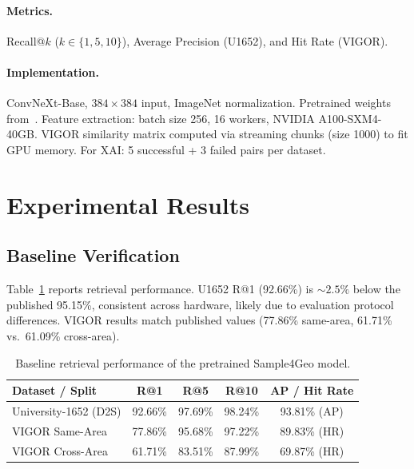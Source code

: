 \documentclass{article}
\begin{document}
\paragraph{Metrics.} Recall@$k$ ($k{\in}\{1,5,10\}$), Average Precision (U1652), and Hit Rate (VIGOR).

\paragraph{Implementation.} ConvNeXt-Base, $384{\times}384$ input, ImageNet normalization.
Pretrained weights from~\citet{deuser2023sample4geo}.
Feature extraction: batch size 256, 16 workers, NVIDIA A100-SXM4-40GB.
VIGOR similarity matrix computed via streaming chunks (size 1000) to fit GPU memory.
For XAI: 5 successful + 3 failed pairs per dataset.

\section{Experimental Results}
\label{sec:results}

\subsection{Baseline Verification}

Table~\ref{tab:baseline} reports retrieval performance.
U1652 R@1 (92.66\%) is ${\sim}2.5\%$ below the published 95.15\%, consistent across hardware, likely due to evaluation protocol differences.
VIGOR results match published values (77.86\% same-area, 61.71\% vs.\ 61.09\% cross-area).

\begin{table}[h]
\vspace{-0.5em}
\caption{Baseline retrieval performance of the pretrained Sample4Geo model.}
\label{tab:baseline}
\centering
\small
\begin{tabular}{lcccc}
\toprule
\textbf{Dataset / Split} & \textbf{R@1} & \textbf{R@5} & \textbf{R@10} & \textbf{AP / Hit Rate} \\
\midrule
University-1652 (D2S) & 92.66\% & 97.69\% & 98.24\% & 93.81\% (AP) \\
VIGOR Same-Area & 77.86\% & 95.68\% & 97.22\% & 89.83\% (HR) \\
VIGOR Cross-Area & 61.71\% & 83.51\% & 87.99\% & 69.87\% (HR) \\
\bottomrule
\end{tabular}
\vspace{-0.5em}
\end{table}
\end{document}
